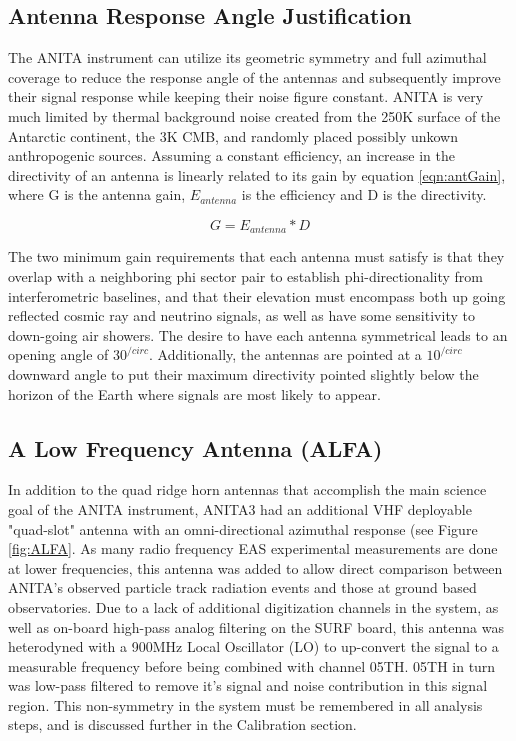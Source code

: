 	\subsection{Antenna Response Angle Justification}
		The ANITA instrument can utilize its geometric symmetry and full azimuthal coverage to reduce the response angle of the antennas and subsequently improve their signal response while keeping their noise figure constant.  ANITA is very much limited by thermal background noise created from the 250K surface of the Antarctic continent, the 3K CMB, and randomly placed possibly unkown anthropogenic sources.  Assuming a constant efficiency, an increase in the directivity of an antenna is linearly related to its gain by equation \ref{eqn:antGain}, where G is the antenna gain, $E_{antenna}$ is the efficiency and D is the directivity.
		
\begin{equation}
	\label{eqn:antGain}
	G = E_{antenna} * D
\end{equation}
		
		The two minimum gain requirements that each antenna must satisfy is that they overlap with a neighboring phi sector pair to establish phi-directionality from interferometric baselines, and that their elevation must encompass both up going reflected cosmic ray and neutrino signals, as well as have some sensitivity to down-going air showers.  The desire to have each antenna symmetrical leads to an opening angle of $30^{/circ}$.  Additionally, the antennas are pointed at a $10^{/circ}$ downward angle to put their maximum directivity pointed slightly below the horizon of the Earth where signals are most likely to appear.
	
	\subsection{A Low Frequency Antenna (ALFA)}
		In addition to the quad ridge horn antennas that accomplish the main science goal of the ANITA instrument, ANITA3 had an additional VHF deployable "quad-slot" antenna with an omni-directional azimuthal response (see Figure \ref{fig:ALFA}.  As many radio frequency EAS experimental measurements are done at lower frequencies, this antenna was added to allow direct comparison between ANITA's observed particle track radiation events and those at ground based observatories.  Due to a lack of additional digitization channels in the system, as well as on-board high-pass analog filtering on the SURF board, this antenna was heterodyned with a 900MHz Local Oscillator (LO) to up-convert the signal to a measurable frequency before being combined with channel 05TH.  05TH in turn was low-pass filtered to remove it's signal and noise contribution in this signal region.  This non-symmetry in the system must be remembered in all analysis steps, and is discussed further in the Calibration section.
		
